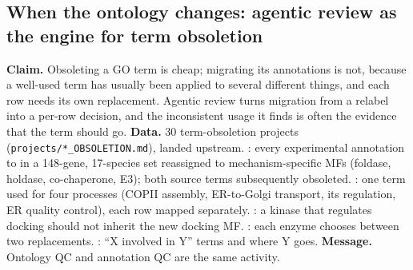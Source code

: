 \subsection{When the ontology changes: agentic review as the engine for term obsoletion}\label{sec:dd-obsoletion}
\textbf{Claim.} Obsoleting a GO term is cheap; migrating its annotations is not, because a
well-used term has usually been applied to several different things, and each row needs its own
replacement. Agentic review turns migration from a relabel into a per-row decision, and the inconsistent
usage it finds is often the evidence that the term should go.
\textbf{Data.}  30 term-obsoletion projects (\texttt{projects/*\_OBSOLETION.md}),
 landed upstream. : every experimental annotation to
 in a 148-gene, 17-species set reassigned to
mechanism-specific MFs (foldase, holdase, co-chaperone, E3); both source terms subsequently obsoleted.
: one term used for four processes (COPII assembly,
ER-to-Golgi transport, its regulation, ER quality control), each row mapped separately.
: a kinase that regulates docking should not inherit
the new docking MF. : each enzyme chooses between two
replacements. : ``X involved in Y'' terms and where Y goes.
\textbf{Message.} Ontology QC and annotation QC are the same activity.
